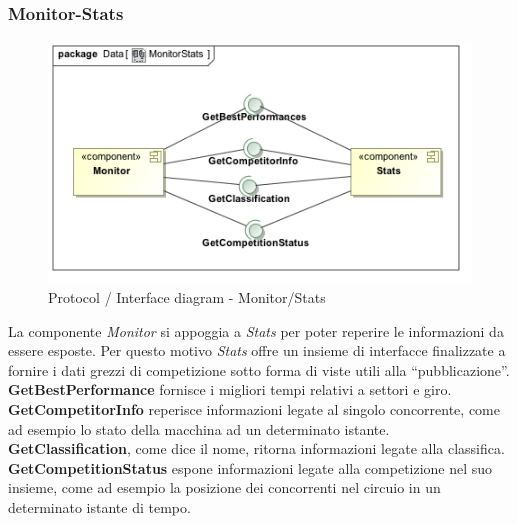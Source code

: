 \subsubsection{Monitor-Stats}
\begin{center}
\begin{figure}[h!]
	\includegraphics[scale=0.55]{img/InteractionDiagram/Implementation_Diagram__MonitorStats.jpg}
\caption{Protocol / Interface diagram - Monitor/Stats}
\end{figure}
\end{center}
La componente \emph{Monitor} si appoggia a \emph{Stats} per poter reperire le informazioni da essere esposte. Per questo motivo
\emph{Stats} offre un insieme di interfacce finalizzate a fornire i dati grezzi di competizione sotto forma di viste utili alla ``pubblicazione''.\\
\textbf{GetBestPerformance} fornisce i migliori tempi relativi a settori e giro.\\
\textbf{GetCompetitorInfo} reperisce informazioni legate al singolo concorrente, come ad esempio lo stato della macchina ad un determinato istante.\\
\textbf{GetClassification}, come dice il nome, ritorna informazioni legate alla classifica.\\
\textbf{GetCompetitionStatus} espone informazioni legate alla competizione nel suo insieme, come ad esempio la posizione dei concorrenti nel circuio
in un determinato istante di tempo.

